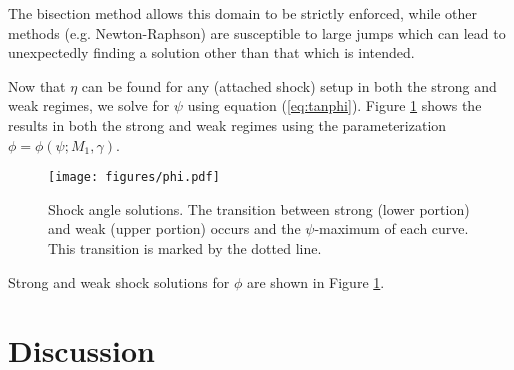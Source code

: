 \documentclass[twocolumn]{aastex631}
\begin{document}
The bisection method allows this domain to be strictly enforced, while other methods (e.g. Newton-Raphson) are susceptible to large jumps which can lead to unexpectedly finding a solution other than that which is intended.

Now that $\eta$ can be found for any (attached shock) setup in both the strong and weak regimes, we solve for $\psi$ using equation (\ref{eq:tanphi}). Figure \ref{fig:phi} shows the results in both the strong and weak regimes using the parameterization $\phi = \phi(\psi;M_1,\gamma)$.


\begin{figure}[t]
    \texttt{[image: figures/phi.pdf]}
    \caption{Shock angle solutions. The transition between strong (lower portion) and weak (upper portion) occurs and the $\psi$-maximum of each curve. This transition is marked by the dotted line.}
    \label{fig:phi}
\end{figure}

Strong and weak shock solutions for $\phi$ are shown in Figure \ref{fig:phi}.

\section{Discussion}



\end{document}
